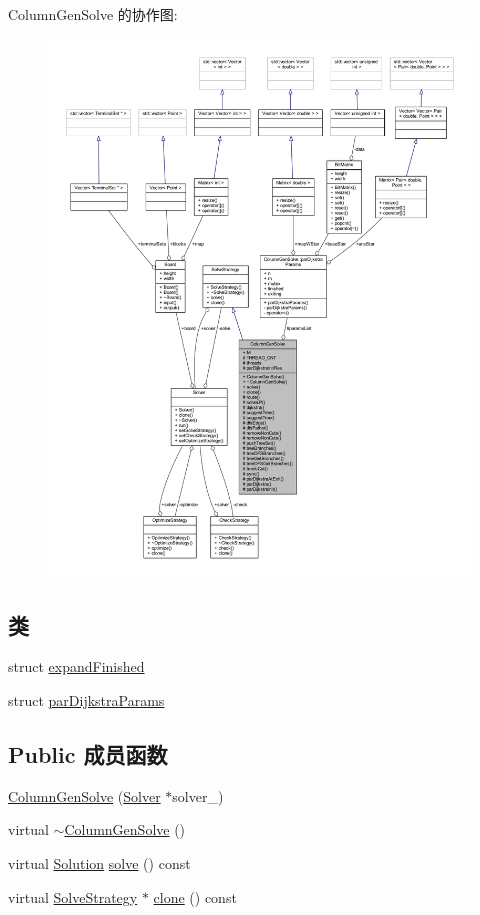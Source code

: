 Column\+Gen\+Solve 的协作图\+:
\nopagebreak
\begin{figure}[H]
\begin{center}
\leavevmode
\includegraphics[width=350pt]{classColumnGenSolve__coll__graph}
\end{center}
\end{figure}
\subsection*{类}
\begin{DoxyCompactItemize}
\item 
struct \hyperlink{structColumnGenSolve_1_1expandFinished}{expand\+Finished}
\item 
struct \hyperlink{structColumnGenSolve_1_1parDijkstraParams}{par\+Dijkstra\+Params}
\end{DoxyCompactItemize}
\subsection*{Public 成员函数}
\begin{DoxyCompactItemize}
\item 
\hyperlink{classColumnGenSolve_a825d4a3f8f1995c6a772535b29b3bbeb}{Column\+Gen\+Solve} (\hyperlink{classSolver}{Solver} $\ast$solver\+\_\+)
\item 
virtual \hyperlink{classColumnGenSolve_a04ccfc4d9676794aa5413590b41a07f4}{$\sim$\+Column\+Gen\+Solve} ()
\item 
virtual \hyperlink{classSolution}{Solution} \hyperlink{classColumnGenSolve_aad7c316627e7ea6de4138db1a33e66ee}{solve} () const 
\item 
virtual \hyperlink{classSolveStrategy}{Solve\+Strategy} $\ast$ \hyperlink{classColumnGenSolve_ae7cc479a554a497f738630259e446b8f}{clone} () const 
\end{DoxyCompactItemize}
